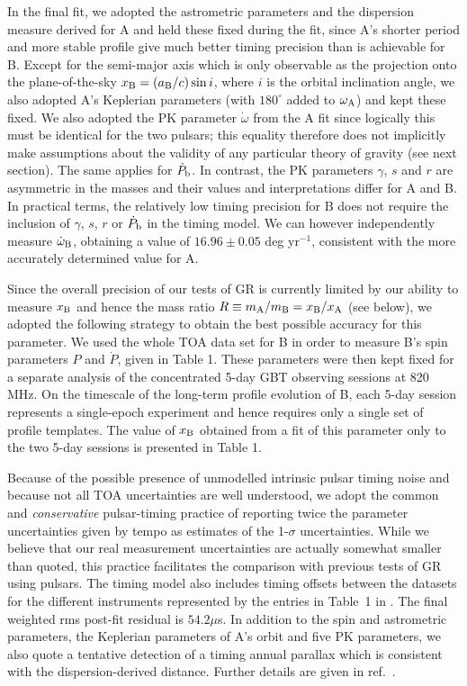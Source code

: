 \documentclass[12pt,psfig]{article}
\begin{document}
In the final fit, we adopted the astrometric parameters and the dispersion
measure derived for A and held these fixed during the fit, since A's shorter
period and more stable profile give much better timing precision than is
achievable for B.  Except for the semi-major axis which is only observable as
the projection onto the plane-of-the-sky $x_{\rm{B}}=(a_{\rm{B}}/c)\sin i$,
where $i$ is the orbital inclination angle, we also adopted A's Keplerian
parameters (with $180^\circ$ added to $\omega_{\rm{A}}$) and kept these fixed.
We also adopted the PK parameter $\dot{\omega}$ from the A fit since logically
this must be identical for the two pulsars; this equality therefore does not
implicitly make assumptions about the validity of any particular theory of
gravity (see next section). The same applies for $\dot{P}_{\rm b}$. In
contrast, the PK parameters $\gamma$, $s$ and $r$ are asymmetric in the masses
and their values and interpretations differ for A and B.  In practical terms,
the relatively low timing precision for B does not require the inclusion of
$\gamma$, $s$, $r$ or $\dot{P}_{\rm b}$ in the timing model. We can however
independently measure $\dot\omega_{\rm B}$, obtaining a value of
$16.96\pm0.05$ deg yr$^{-1}$, consistent with the more accurately determined
value for A.

Since the overall precision of our tests of GR is currently limited by our
ability to measure $x_{\rm{B}}$ and hence the mass ratio $R \equiv
m_{\rm{A}}/m_{\rm{B}} = x_{\rm{B}}/x_{\rm{A}}$ (see below), we adopted the
following strategy to obtain the best possible accuracy for this parameter. We
used the whole TOA data set for B in order to measure B's spin parameters $P$
and $\dot{P}$, given in Table 1. These parameters were then
kept fixed for a separate analysis of the concentrated 5-day GBT observing
sessions at 820 MHz.  On the timescale of the long-term profile evolution of
B, each 5-day session represents a single-epoch experiment and hence requires
only a single set of profile templates. The value of $x_{\rm{B}}$ obtained
from a fit of this parameter only to the two 5-day sessions is presented in
Table 1.

Because of the possible presence of unmodelled intrinsic pulsar timing noise
and because not all TOA uncertainties are well understood, we adopt the common
and {\em conservative} pulsar-timing practice of reporting twice the parameter
uncertainties given by {\sc tempo} as estimates of the 1-$\sigma$
uncertainties.  While we believe that our real measurement uncertainties are
actually somewhat smaller than quoted, this practice facilitates the
comparison with previous tests of GR using pulsars.  The timing model also
includes timing offsets between the datasets for the different instruments
represented by the entries in Table~1 in \cite{som}.  The final weighted rms
post-fit residual is $54.2\mu$s.  In addition to the spin and astrometric
parameters, the Keplerian parameters of A's orbit and five PK parameters, we
also quote a tentative detection of a timing annual parallax which is
consistent with the dispersion-derived distance. Further details are given in
ref.~\cite{som}.
\end{document}
